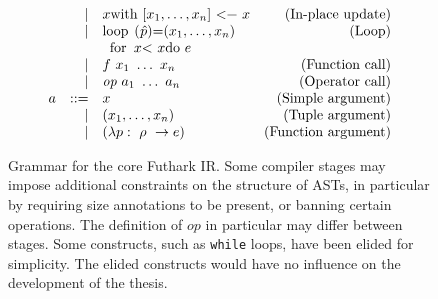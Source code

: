 \begin{figure*}
$$\begin{array}{lrlr}
      & | & \mbox{\lstinline[mathescape]!$x$ with [$x_{1},\ldots,x_{n}$] <-\ $x$!} &\mbox{(In-place update)}\\
      & | & \mbox{\lstinline[mathescape]!loop ($\hat{p}$)=($x_{1},\ldots,x_{n}$)!}  &  \mbox{(Loop)} \\
      &   & \mbox{\lstinline[mathescape]!\ for\ $x$ <\ $x$ do\ $e$!}\\
      & | & f~x_{1}~\ldots~x_{n} & \mbox{(Function call)}\\
      & | & \emph{op}~a_{1}~\ldots~a_{n} & \mbox{(Operator call)} \\
    a & ::= & x & \mbox{(Simple argument)} \\
      & |   & (x_{1}, \ldots, x_{n}) & \mbox{(Tuple argument)} \\
      & |   & (\Fn{\tty}{p}{e}) & \mbox{(Function argument)}
  \end{array}
  $$

  \caption{Grammar for the core Futhark IR.  Some compiler stages may
    impose additional constraints on the structure of ASTs, in
    particular by requiring size annotations to be present, or banning
    certain operations.  The definition of $op$ in particular may
    differ between stages.  Some constructs, such as \lstinline{while}
    loops, have been elided for simplicity.  The elided constructs
    would have no influence on the development of the thesis.}
  \label{fig:futhark-ir}
\end{figure*}

